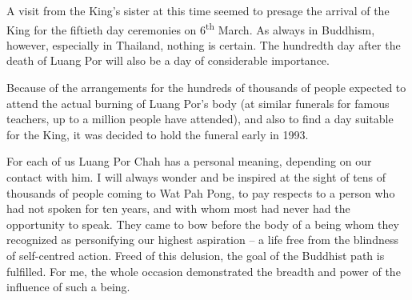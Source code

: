 A visit from the King's sister at this time seemed to presage the
arrival of the King for the fiftieth day ceremonies on 6\textsuperscript{th} March. As
always in Buddhism, however, especially in Thailand, nothing is certain. 
The hundredth day after the death of Luang Por will also be a day of
considerable importance. 

Because of the arrangements for the hundreds of thousands of people
expected to attend the actual burning of Luang Por's body (at similar
funerals for famous teachers, up to a million people have attended), and
also to find a day suitable for the King, it was decided to hold the
funeral early in 1993. 

For each of us Luang Por Chah has a personal meaning, depending on our
contact with him. I will always wonder and be inspired at the sight of
tens of thousands of people coming to Wat Pah Pong, to pay respects to a
person who had not spoken for ten years, and with whom most had never
had the opportunity to speak. They came to bow before the body of a
being whom they recognized as personifying our highest aspiration -- a
life free from the blindness of self-centred action. Freed of this
delusion, the goal of the Buddhist path is fulfilled. For me, the whole
occasion demonstrated the breadth and power of the influence of such a
being. 
